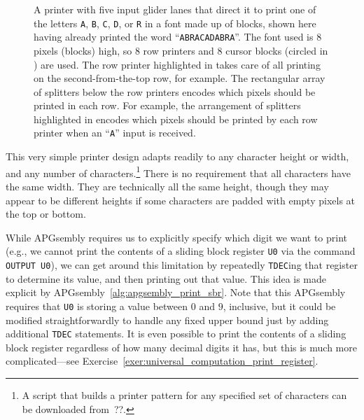 \begin{figure}[!htb]
	\centering
	\caption{A printer with five input glider lanes that direct it to print one of the letters \texttt{A}, \texttt{B}, \texttt{C}, \texttt{D}, or \texttt{R} in a font made up of blocks, shown here having already printed the word ``\texttt{ABRACADABRA}''. The font used is $8$ pixels (blocks) high, so $8$ row printers and $8$ cursor blocks (circled in ) are used. The row printer highlighted in  takes care of all printing on the second-from-the-top row, for example. The rectangular array of splitters below the row printers encodes which pixels should be printed in each row. For example, the arrangement of splitters highlighted in  encodes which pixels should be printed by each row printer when an ``\texttt{A}'' input is received.}\label{fig:abracadabra_printer}
\end{figure}

This very simple printer design adapts readily to any character height or width, and any number of characters.\footnote{A script that builds a printer pattern for any specified set of characters can be downloaded from~??.} There is no requirement that all characters have the same width. They are technically all the same height, though they may appear to be different heights if some characters are padded with empty pixels at the top or bottom.

While APGsembly requires us to explicitly specify which digit we want to print (e.g., we cannot print the contents of a sliding block register \texttt{U0} via the command \texttt{OUTPUT U0}), we can get around this limitation by repeatedly \texttt{TDEC}ing that register to determine its value, and then printing out that value. This idea is made explicit by APGsembly~\ref{alg:apgsembly_print_sbr}. Note that this APGsembly requires that \texttt{U0} is storing a value between $0$ and $9$, inclusive, but it could be modified straightforwardly to handle any fixed upper bound just by adding additional \texttt{TDEC} statements. It is even possible to print the contents of a sliding block register regardless of how many decimal digits it has, but this is much more complicated---see Exercise~\ref{exer:universal_computation_print_register}.

